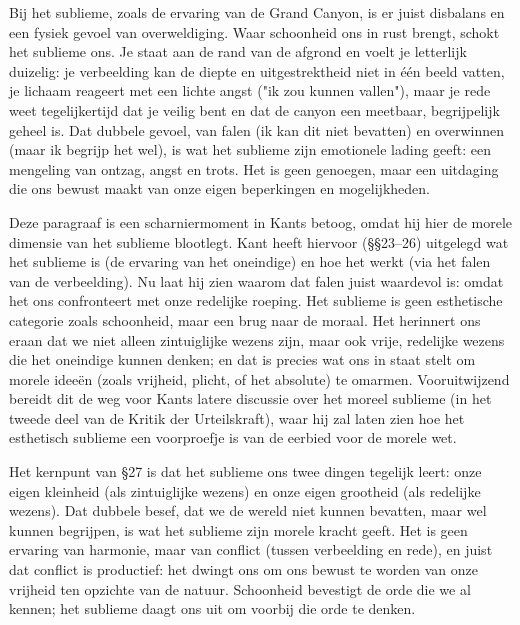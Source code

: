 \begin{mdframed}[leftmargin=0pt,rightmargin=0pt,backgroundcolor=blue!6,linecolor=white,innertopmargin=6pt,innerbottommargin=6pt]
Bij het sublieme, zoals de ervaring van de Grand Canyon, is er juist disbalans en een fysiek gevoel van overweldiging. Waar schoonheid ons in rust brengt, schokt het sublieme ons. Je staat aan de rand van de afgrond en voelt je letterlijk duizelig: je verbeelding kan de diepte en uitgestrektheid niet in één beeld vatten, je lichaam reageert met een lichte angst ("ik zou kunnen vallen"), maar je rede weet tegelijkertijd dat je veilig bent en dat de canyon een meetbaar, begrijpelijk geheel is. Dat dubbele gevoel, van falen (ik kan dit niet bevatten) en overwinnen (maar ik begrijp het wel), is wat het sublieme zijn emotionele lading geeft: een mengeling van ontzag, angst en trots. Het is geen genoegen, maar een uitdaging die ons bewust maakt van onze eigen beperkingen en mogelijkheden.

Deze paragraaf is een scharniermoment in Kants betoog, omdat hij hier de morele dimensie van het sublieme blootlegt. Kant heeft hiervoor (§§23–26) uitgelegd wat het sublieme is (de ervaring van het oneindige) en hoe het werkt (via het falen van de verbeelding). Nu laat hij zien waarom dat falen juist waardevol is: omdat het ons confronteert met onze redelijke roeping. Het sublieme is geen esthetische categorie zoals schoonheid, maar een brug naar de moraal. Het herinnert ons eraan dat we niet alleen zintuiglijke wezens zijn, maar ook vrije, redelijke wezens die het oneindige kunnen denken; en dat is precies wat ons in staat stelt om morele ideeën (zoals vrijheid, plicht, of het absolute) te omarmen. Vooruitwijzend bereidt dit de weg voor Kants latere discussie over het moreel sublieme (in het tweede deel van de Kritik der Urteilskraft), waar hij zal laten zien hoe het esthetisch sublieme een voorproefje is van de eerbied voor de morele wet.

Het kernpunt van §27 is dat het sublieme ons twee dingen tegelijk leert: onze eigen kleinheid (als zintuiglijke wezens) en onze eigen grootheid (als redelijke wezens). Dat dubbele besef, dat we de wereld niet kunnen bevatten, maar wel kunnen begrijpen, is wat het sublieme zijn morele kracht geeft. Het is geen ervaring van harmonie, maar van conflict (tussen verbeelding en rede), en juist dat conflict is productief: het dwingt ons om ons bewust te worden van onze vrijheid ten opzichte van de natuur. Schoonheid bevestigt de orde die we al kennen; het sublieme daagt ons uit om voorbij die orde te denken.

\end{mdframed}


